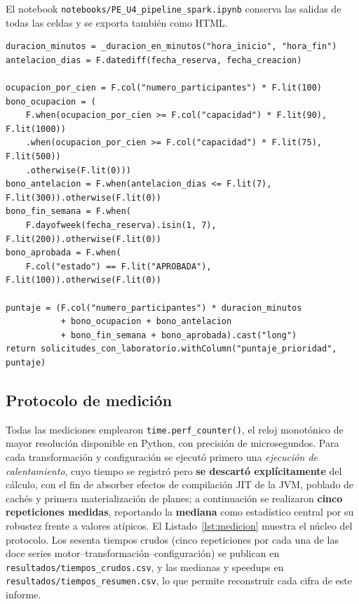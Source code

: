\documentclass[10pt,journal]{IEEEtran}
\begin{document}
El notebook
\texttt{notebooks/PE\_U4\_pipeline\_spark.ipynb} conserva las salidas de todas
las celdas y se exporta tambi\'en como HTML.

\begin{lstlisting}[caption={N\'ucleo de la columna derivada T4 en PySpark (extracto de \texttt{src/transformaciones\_spark.py}).},label={lst:sparkT4}]
duracion_minutos = _duracion_en_minutos("hora_inicio", "hora_fin")
antelacion_dias = F.datediff(fecha_reserva, fecha_creacion)

ocupacion_por_cien = F.col("numero_participantes") * F.lit(100)
bono_ocupacion = (
    F.when(ocupacion_por_cien >= F.col("capacidad") * F.lit(90), F.lit(1000))
    .when(ocupacion_por_cien >= F.col("capacidad") * F.lit(75), F.lit(500))
    .otherwise(F.lit(0)))
bono_antelacion = F.when(antelacion_dias <= F.lit(7), F.lit(300)).otherwise(F.lit(0))
bono_fin_semana = F.when(
    F.dayofweek(fecha_reserva).isin(1, 7), F.lit(200)).otherwise(F.lit(0))
bono_aprobada = F.when(
    F.col("estado") == F.lit("APROBADA"), F.lit(100)).otherwise(F.lit(0))

puntaje = (F.col("numero_participantes") * duracion_minutos
           + bono_ocupacion + bono_antelacion
           + bono_fin_semana + bono_aprobada).cast("long")
return solicitudes_con_laboratorio.withColumn("puntaje_prioridad", puntaje)
\end{lstlisting}

\subsection{Protocolo de medici\'on}
\label{sec:protocolo}
Todas las mediciones emplearon \texttt{time.perf\_counter()}, el reloj
monot\'onico de mayor resoluci\'on disponible en Python, con precisi\'on de
microsegundos. Para cada transformaci\'on y configuraci\'on se ejecut\'o
primero una \emph{ejecuci\'on de calentamiento}, cuyo tiempo se registr\'o pero
\textbf{se descart\'o expl\'icitamente} del c\'alculo, con el fin de absorber
efectos de compilaci\'on JIT de la JVM, poblado de cach\'es y primera
materializaci\'on de planes; a continuaci\'on se realizaron \textbf{cinco
repeticiones medidas}, reportando la \textbf{mediana} como estad\'istico
central por su robustez frente a valores at\'ipicos. El
Listado~\ref{lst:medicion} muestra el n\'ucleo del protocolo. Los sesenta
tiempos crudos (cinco repeticiones por cada una de las doce series
motor--transformaci\'on--configuraci\'on) se publican en
\texttt{resultados/tiempos\_crudos.csv}, y las medianas y speedups en
\texttt{resultados/tiempos\_resumen.csv}, lo que permite reconstruir cada cifra
de este informe.
\end{document}
